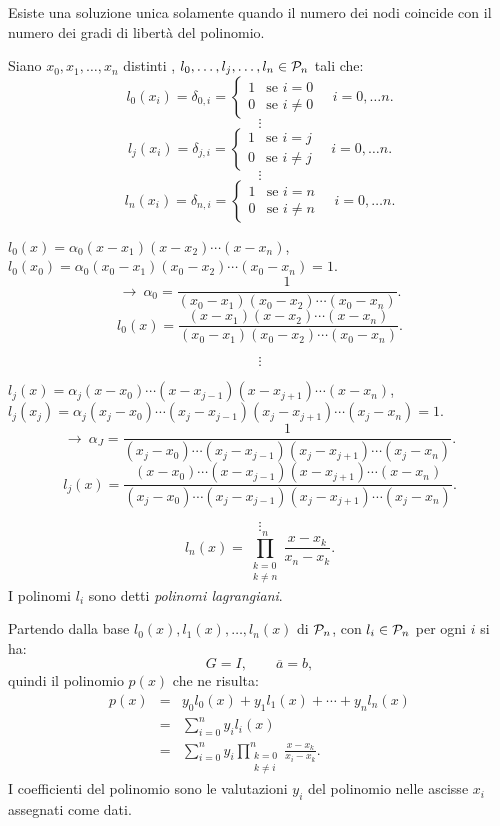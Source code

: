 \begin{notabene}
Esiste una soluzione unica solamente quando il numero dei nodi coincide
con il numero dei gradi di libertà del polinomio.
\end{notabene}

\begin{defi}
Siano $x_0, x_1, \ldots, x_n$ distinti , $l_0, \ldots,l_j, \ldots, l_n \in
\mathcal{P}_n$ tali che:
\[
l_0(x_i) = \delta_{0,i} = \left\{\begin{array}{lr}
1 & \textrm{se } i = 0 \\
0 & \textrm{se } i \neq 0
\end{array}\right. \quad i = 0, \ldots n.
\]
\[\vdots\]
\[
l_j(x_i) = \delta_{j,i} = \left\{\begin{array}{lr}
1 & \textrm{se } i = j \\
0 & \textrm{se } i \neq j
\end{array}\right. \quad i = 0, \ldots n.
\]
\[\vdots\]
\[
l_n(x_i) = \delta_{n,i} = \left\{\begin{array}{lr}
1 & \textrm{se } i = n \\
0 & \textrm{se } i \neq n
\end{array}\right. \quad i = 0, \ldots n.
\]
\begin{center}
$l_0(x) = \alpha_0(x-x_1)(x-x_2)\cdots(x-x_n)$,\\
$l_0(x_0) = \alpha_0(x_0-x_1)(x_0-x_2)\cdots(x_0-x_n) = 1$.
\[ \longrightarrow\
\alpha_0 = \frac{1}{(x_0-x_1)(x_0-x_2)\cdots(x_0-x_n)}.\]
\[l_0(x) =\frac{(x-x_1)(x-x_2)\cdots(x-x_n)}{(x_0-x_1)(x_0-x_2)\cdots(x_0-x_n)}.
\]
\end{center}
\[\vdots\]
\begin{center}
$l_j(x) = \alpha_j(x-x_0)\cdots(x-x_{j-1})(x-x_{j+1})\cdots(x-x_n)$,\\
$l_j(x_j) = \alpha_j(x_j-x_0)\cdots(x_j-x_{j-1})(x_j-x_{j+1})\cdots(x_j-x_n) = 1.
$
\[\longrightarrow\
\alpha_J = \frac{1}{(x_j-x_0)\cdots(x_j-x_{j-1})(x_j-x_{j+1})\cdots(x_j-x_n)}.\]
\[l_j(x) =\frac{(x-x_0)\cdots(x-x_{j-1})(x-x_{j+1})\cdots(x-x_n)}{(x_j-
x_0)
\cdots(x_j-x_{j-1})(x_j-x_{j+1})\cdots(x_j-x_n)}.\]
\end{center}
\[\vdots\]
\[l_n(x) = \prod_{\substack{k=0\\ k \neq n }}^n \frac{x-x_k}{x_n-x_k}.\]
I polinomi $l_i$ sono detti \emph{polinomi lagrangiani}.
\begin{flushleft}
Partendo dalla base $l_0(x), l_1(x), \ldots, l_n(x)$ di $\mathcal{P}_n$, con $l_i \in
\mathcal{P}_n$ per ogni $i$ si ha:
\[G = I, \qquad \overline{a} = b,\]
quindi il polinomio $p(x)$ che ne risulta:
\[
\begin{array}{lcl}\displaystyle
p(x) & = & y_0l_0(x)+ y_1l_1(x)+\cdots +y_nl_n(x) \\
     & = &\displaystyle \sum_{i=0}^ny_il_i(x)\\
     & = &\displaystyle \sum_{i=0}^ny_i\prod_{\substack{k=0\\ k \neq i }}^n
         \frac{x-x_k}{x_i-x_k}.
\end{array}
\]
I coefficienti del polinomio sono le valutazioni $y_i$ del polinomio nelle
ascisse $x_i$ assegnati come dati.


\end{flushleft}
\end{defi}
